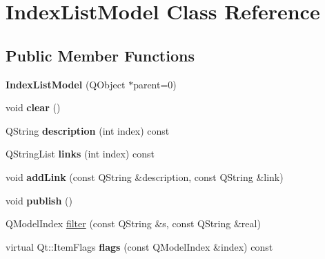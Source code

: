 \hypertarget{classIndexListModel}{
\section{IndexListModel Class Reference}
\label{classIndexListModel}
}
\subsection*{Public Member Functions}
\begin{DoxyCompactItemize}
\item 
\hypertarget{classIndexListModel_a8d5a5ac4d4ffc2a2cc02c977d15443ff}{
{\bfseries IndexListModel} (QObject $\ast$parent=0)}
\label{classIndexListModel_a8d5a5ac4d4ffc2a2cc02c977d15443ff}

\item 
\hypertarget{classIndexListModel_a0c7ae859fb94e0c2c558ee7d4c9dfc41}{
void {\bfseries clear} ()}
\label{classIndexListModel_a0c7ae859fb94e0c2c558ee7d4c9dfc41}

\item 
\hypertarget{classIndexListModel_a944f32b65879d7d958788fbeebe71ef6}{
QString {\bfseries description} (int index) const }
\label{classIndexListModel_a944f32b65879d7d958788fbeebe71ef6}

\item 
\hypertarget{classIndexListModel_a35044177c505f24eaa56e8792b56f13a}{
QStringList {\bfseries links} (int index) const }
\label{classIndexListModel_a35044177c505f24eaa56e8792b56f13a}

\item 
\hypertarget{classIndexListModel_ab10cd1d5f88490ca3be3a49ec02fd7a3}{
void {\bfseries addLink} (const QString \&description, const QString \&link)}
\label{classIndexListModel_ab10cd1d5f88490ca3be3a49ec02fd7a3}

\item 
\hypertarget{classIndexListModel_a4b2b2deb02aae24ae41a615ca20cb990}{
void {\bfseries publish} ()}
\label{classIndexListModel_a4b2b2deb02aae24ae41a615ca20cb990}

\item 
QModelIndex \hyperlink{classIndexListModel_a4be15a99a9b145e7a5004a33d331a345}{filter} (const QString \&s, const QString \&real)
\item 
\hypertarget{classIndexListModel_ac7f765eeae83136bc5e4ef41c5ee4a09}{
virtual Qt::ItemFlags {\bfseries flags} (const QModelIndex \&index) const }
\label{classIndexListModel_ac7f765eeae83136bc5e4ef41c5ee4a09}

\end{DoxyCompactItemize}


